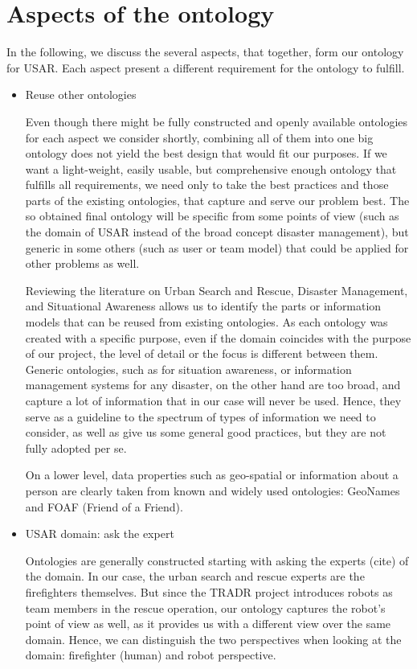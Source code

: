 \section{Aspects of the ontology} 
In the following, we discuss the several aspects, that together, form our ontology for USAR. Each aspect present a different requirement for the ontology to fulfill. 
\begin{itemize}
\item Reuse other ontologies

Even though there might be fully constructed and openly available ontologies for each aspect we consider shortly, combining all of them into one big ontology does not yield the best design that would fit our purposes. If we want a light-weight, easily usable, but comprehensive enough ontology that fulfills all requirements, we need only to take the best practices and those parts of the existing ontologies, that capture and serve our problem best. The so obtained final ontology will be specific from some points of view (such as the domain of USAR instead of the broad concept disaster management), but generic in some others (such as user or team model) that could be applied for other problems as well.

Reviewing the literature on Urban Search and Rescue, Disaster Management, and Situational Awareness allows us to identify the parts or information models that can be reused from existing ontologies. As each ontology was created with a specific purpose, even if the domain coincides with the purpose of our project, the level of detail or the focus is different between them. Generic ontologies, such as for situation awareness, or information management systems for any disaster, on the other hand are too broad, and capture a lot of information that in our case will never be used. Hence, they serve as a guideline to the spectrum of types of information we need to consider, as well as give us some general good practices, but they are not fully adopted per se. 

On a lower level, data properties such as geo-spatial or information about a person are clearly taken from known and widely used ontologies: GeoNames and FOAF (Friend of a Friend). 


\item USAR domain: ask the expert 

Ontologies are generally constructed starting with asking the experts (cite) of the domain. In our case, the urban search and rescue experts are the firefighters themselves. But since the TRADR project introduces robots as team members in the rescue operation, our ontology captures the robot's point of view as well, as it provides us with a different view over the same domain. Hence, we can distinguish the two perspectives when looking at the domain: firefighter (human) and robot perspective.
\begin{itemize}


\end{itemize}
\end{itemize}
